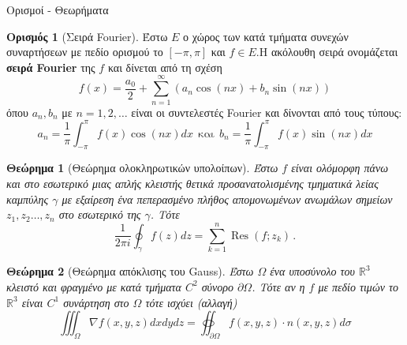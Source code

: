 \documentclass[a4paper,11pt]{article}
\newtheorem{theorem}{Θεώρημα}
\DeclareMathOperator{\Res}{Res}
\theoremstyle{definition}
\newtheorem{definition}{Ορισμός}
\begin{document}
\newpage
\begin{center}
{\Large Ορισμοί - Θεωρήματα}
\end{center}
\begin{definition}[Σειρά Fourier]
Έστω $ E $ ο χώρος των κατά τμήματα συνεχών συναρτήσεων με πεδίο ορισμού το $ [-\pi,\pi] $ και $ f\in E $.H ακόλουθη σειρά ονομάζεται \textbf{σειρά Fourier} της $ f $ και δίνεται από τη σχέση
\[ f(x)=\frac{a_0}{2}+\sum_{n=1}^{\infty}{(a_n\cos{(nx)}+b_n\sin{(nx)})} \]
όπου $ a_n,b_n $ με $ n=1,2,\ldots $ είναι οι συντελεστές Fourier και δίνονται από τους τύπους:
\[ a_n=\frac{1}{\pi}\int_{-\pi}^{\pi}{f(x)\cos{(nx)}}d x\ \ \textrm{και}\ \ b_n=\frac{1}{\pi}\int_{-\pi}^{\pi}{f(x)\sin{(nx)}}d x \]
\end{definition}

\begin{theorem}[Θεώρημα ολοκληρωτικών υπολοίπων]
Έστω $ f $ είναι ολόμορφη πάνω και στο εσωτερικό μιας απλής κλειστής θετικά προσανατολισμένης τμηματικά λείας καμπύλης $ \gamma $ με εξαίρεση ένα πεπερασμένο πλήθος απομονωμένων ανωμάλων σημείων $ z_1,z_2\ldots,z_n $ στο εσωτερικό της $ \gamma $. Τότε
\[
  \frac{1}{2\pi i}\oint_\gamma\! f(z)dz = \sum_{k=1}^n\Res(f;z_k)\,.
\]
\end{theorem}

\begin{theorem}[Θεώρημα απόκλισης του Gauss]
Έστω $ \Omega $ ένα υποσύνολο του $ \mathbb{R}^3 $ κλειστό και φραγμένο με κατά τμήματα $ C^2 $ σύνορο $ \partial\Omega $. Τότε αν η $ f $ με πεδίο τιμών το $ \mathbb{R}^3 $ είναι $ C^1 $ συνάρτηση στο $ \Omega $ τότε ισχύει (αλλαγή)
\[
 \iiint_{\Omega}{\nabla f(x,y,z)dxdydz}=\oiint_{\partial\Omega}{f(x,y,z)\cdot n(x,y,z)d\sigma}
\]
\end{theorem}
\end{document}
